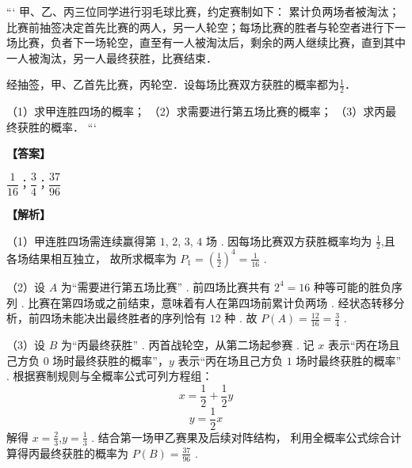 \documentclass{exam-zh}
\newenvironment{answer}{\par\vspace{0.5em}\noindent\textbf{【答案】}\par}{\par\vspace{1em}}
\newenvironment{solutions}{\par\vspace{0.5em}\noindent\textbf{【解析】}\par}{\par\vspace{1em}}\usepackage{lastpage}
\begin{document}

\begin{question}
```
甲、乙、丙三位同学进行羽毛球比赛，约定赛制如下：  
累计负两场者被淘汰；比赛前抽签决定首先比赛的两人，另一人轮空；每场比赛的胜者与轮空者进行下一场比赛，负者下一场轮空，直至有一人被淘汰后，剩余的两人继续比赛，直到其中一人被淘汰，另一人最终获胜，比赛结束．  

经抽签，甲、乙首先比赛，丙轮空．设每场比赛双方获胜的概率都为$\frac{1}{2}$．  

（1）求甲连胜四场的概率；  
（2）求需要进行第五场比赛的概率；  
（3）求丙最终获胜的概率．
```
\end{question}

\begin{answer}
$\dfrac{1}{16}；\dfrac{3}{4}；\dfrac{37}{96}$
\end{answer}

\begin{solutions}
（1）甲连胜四场需连续赢得第 $1$, $2$, $3$, $4$ 场 .
因每场比赛双方获胜概率均为 $\displaystyle \frac{1}{2}$,且各场结果相互独立，
故所求概率为 $P_1 = \left(\displaystyle \frac{1}{2}\right)^4 = \displaystyle \frac{1}{16}$ .

（2）设 $A$ 为“需要进行第五场比赛” .
前四场比赛共有 $2^4 = 16$ 种等可能的胜负序列 .
比赛在第四场或之前结束，意味着有人在第四场前累计负两场 .
经状态转移分析，前四场未能决出最终胜者的序列恰有 $12$ 种 .
故 $P(A) = \displaystyle \frac{12}{16} = \displaystyle \frac{3}{4}$ .

（3）设 $B$ 为“丙最终获胜” .
丙首战轮空，从第二场起参赛 .
记 $x$ 表示“丙在场且己方负 $0$ 场时最终获胜的概率”，$y$ 表示“丙在场且己方负 $1$ 场时最终获胜的概率” .
根据赛制规则与全概率公式可列方程组：
$$
x = \displaystyle \frac{1}{2} + \displaystyle \frac{1}{2} y
$$
$$
y = \displaystyle \frac{1}{2} x
$$
解得 $x = \displaystyle \frac{2}{3}$,$y = \displaystyle \frac{1}{3}$ .
结合第一场甲乙赛果及后续对阵结构，
利用全概率公式综合计算得丙最终获胜的概率为 $P(B) = \displaystyle \frac{37}{96}$ .
\end{solutions}
\end{document}
